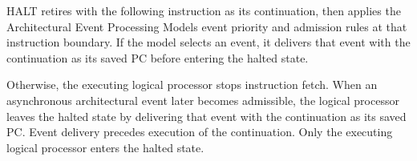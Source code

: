 HALT retires with the following instruction as its continuation, then applies the Architectural Event Processing
Model\textquotesingle{}s event priority and admission rules at that instruction boundary. If the model selects an event, it
delivers that event with the continuation as its saved PC before entering the halted state.

Otherwise, the executing logical processor stops instruction fetch. When an asynchronous architectural event later
becomes admissible, the logical processor leaves the halted state by delivering that event with the continuation as
its saved PC. Event delivery precedes execution of the continuation. Only the executing logical processor enters
the halted state.
